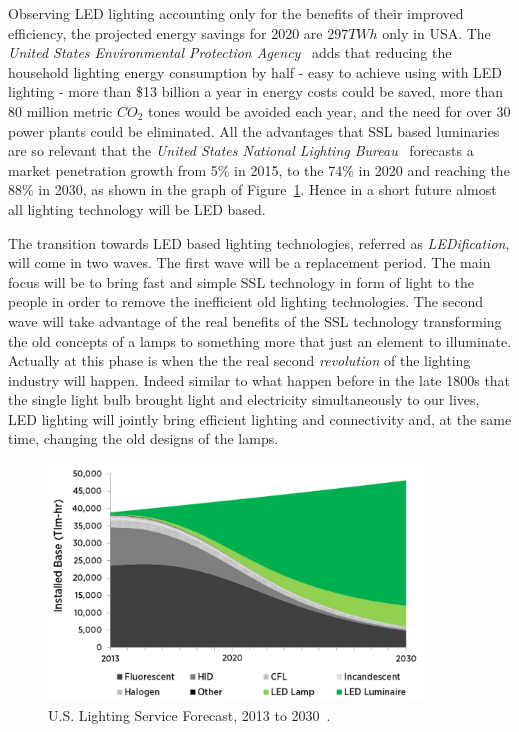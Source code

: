 Observing LED lighting accounting only for the benefits of their improved efficiency, the projected energy savings for 2020 are $297TWh$ only in USA. The \emph{United States Environmental Protection Agency}~\cite{14USDoE} adds that reducing the household lighting energy consumption by half - easy to achieve using with LED lighting -  more than \$13 billion a year in energy costs could be saved, more than 80 million metric $CO_2$ tones would be avoided each year, and the need for over 30 power plants could be eliminated. All the advantages that SSL based luminaries are so relevant that the \emph{United States National Lighting Bureau}~\cite{14USDoE} forecasts a market penetration growth from 5\% in 2015, to the 74\% in 2020 and reaching the 88\% in 2030, as shown in the graph of Figure~\ref{fig:lighting_forecast}. Hence in a short future almost all lighting technology will be LED based.

The transition towards LED based lighting technologies, referred as \emph{LEDification}, will come in two waves. The first wave will be a replacement period. The main focus will be to bring fast and simple SSL technology in form of light to the people in order to remove the inefficient old lighting technologies. The second wave will take advantage of the real benefits of the SSL technology transforming the old concepts of a lamps to something more that just an element to illuminate. Actually at this phase is when the  the real second \emph{revolution} of the lighting industry will happen. Indeed similar to what happen before in the late 1800s that the single light bulb brought light and electricity simultaneously to our lives,  LED lighting will jointly bring efficient lighting and connectivity and, at the same time, changing the old designs of the lamps.

\begin{figure}[!h]
\centering
\includegraphics[width=10cm]{./0_intro/img/lighting_forecast.png}
\caption{U.S. Lighting Service Forecast, 2013 to 2030~\cite{14USDoE}.  }
\label{fig:lighting_forecast}
\end{figure}

